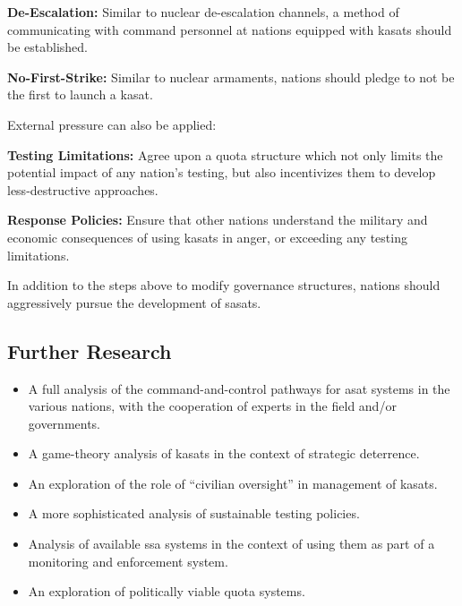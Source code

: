 \textbf{De-Escalation:} Similar to nuclear de-escalation channels, a
method of communicating with command personnel at nations equipped
with \acp{kasat} should be established.

\textbf{No-First-Strike:} Similar to nuclear armaments, nations should
pledge to not be the first to launch a \ac{kasat}.

\noindent External pressure can also be applied:

\textbf{Testing Limitations:} Agree upon a quota structure which not
only limits the potential impact of any nation's testing, but also
incentivizes them to develop less-destructive approaches.

\textbf{Response Policies:} Ensure that other nations understand the
military and economic consequences of using \acp{kasat} in anger, or
exceeding any testing limitations.

In addition to the steps above to modify governance structures,
nations should aggressively pursue the development of \acp{sasat}.


\subsection{Further Research}
\label{section::furtherWork}

\begin{itemize}

\item A full analysis of the command-and-control pathways for asat
  systems in the various nations, with the cooperation of experts in
  the field and/or governments.

\item A game-theory analysis of \acp{kasat} in the context of
  strategic deterrence.

\item An exploration of the role of ``civilian oversight'' in
  management of \acp{kasat}.

\item A more sophisticated analysis of sustainable testing policies.

\item Analysis of available \ac{ssa} systems in the context of using
  them as part of a monitoring and enforcement system.

\item An exploration of politically viable quota systems.

\end{itemize}



